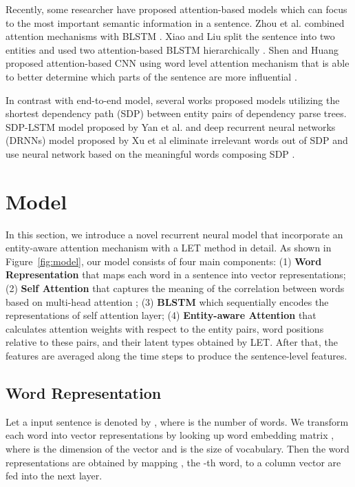 \documentclass[twoside,leqno,twocolumn]{article}
\begin{document}
Recently, some researcher have proposed attention-based models which can focus to the most important semantic information in a sentence.
Zhou et al. combined attention mechanisms with BLSTM \cite{zhou2016attention}.
Xiao and Liu split the sentence into two entities and used two attention-based BLSTM hierarchically \cite{xiao2016semantic}.
Shen and Huang proposed attention-based CNN using word level attention mechanism that is able to better determine which parts of the sentence are more influential \cite{huang2016attention}.

In contrast with end-to-end model, several works proposed models utilizing the shortest dependency path (SDP) between entity pairs of dependency parse trees.
SDP-LSTM model proposed by Yan et al. and deep recurrent neural networks (DRNNs) model proposed by Xu et al eliminate irrelevant words out of SDP and use neural network based on the meaningful words composing SDP \cite{xu2015classifying, xu2016improved}.



\section{Model}
In this section, we introduce a novel recurrent neural model that incorporate an entity-aware attention mechanism with a LET method in detail.
As shown in Figure~\ref{fig:model}, our model consists of four main components: 
(1) \textbf{Word Representation} that maps each word in a sentence into vector representations; 
(2) \textbf{Self Attention} that captures the meaning of the correlation between words based on multi-head attention \cite{vaswani2017attention}; 
(3) \textbf{BLSTM} which sequentially encodes the representations of self attention layer;
(4) \textbf{Entity-aware Attention} that calculates attention weights with respect to the entity pairs, word positions relative to these pairs, and their latent types obtained by LET. 
After that, the features are averaged along the time steps to produce the sentence-level features.


\subsection{Word Representation}
Let a input sentence is denoted by , where  is the number of words.
We transform each word into vector representations by looking up word embedding matrix , where  is the dimension of the vector and  is the size of vocabulary. 
Then the word representations  are obtained by mapping , the -th word, to a column vector  are fed into the next layer.
\end{document}
